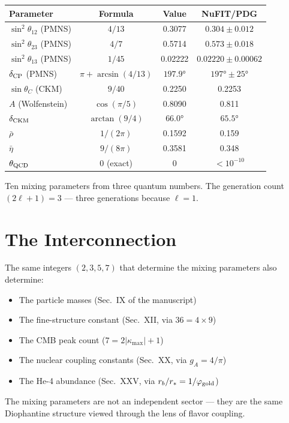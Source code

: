 \documentclass[11pt,letterpaper]{article}
\numberwithin{equation}{section}
\begin{document}
\begin{center}
\begin{tabular}{lccc}
\toprule
Parameter & Formula & Value & NuFIT/PDG \\
\midrule
$\sin^2\theta_{12}$ (PMNS) & $4/13$ & 0.3077 & $0.304 \pm 0.012$ \\
$\sin^2\theta_{23}$ (PMNS) & $4/7$ & 0.5714 & $0.573 \pm 0.018$ \\
$\sin^2\theta_{13}$ (PMNS) & $1/45$ & 0.02222 & $0.02220 \pm 0.00062$ \\
$\delta_{\rm CP}$ (PMNS) & $\pi + \arcsin(4/13)$ & $197.9°$ & $197° \pm 25°$ \\
$\sin\theta_C$ (CKM) & $9/40$ & 0.2250 & 0.2253 \\
$A$ (Wolfenstein) & $\cos(\pi/5)$ & 0.8090 & 0.811 \\
$\delta_{\rm CKM}$ & $\arctan(9/4)$ & $66.0°$ & $65.5°$ \\
$\bar\rho$ & $1/(2\pi)$ & 0.1592 & 0.159 \\
$\bar\eta$ & $9/(8\pi)$ & 0.3581 & 0.348 \\
$\theta_{\rm QCD}$ & 0 (exact) & 0 & $< 10^{-10}$ \\
\bottomrule
\end{tabular}
\end{center}

Ten mixing parameters from three quantum numbers.  The generation
count $(2\ell+1) = 3$ --- three generations because $\ell = 1$.

\section{The Interconnection}

The same integers $(2,3,5,7)$ that determine the mixing parameters
also determine:
\begin{itemize}
\item The particle masses (Sec.~IX of the manuscript)
\item The fine-structure constant (Sec.~XII, via $36 = 4 \times 9$)
\item The CMB peak count ($7 = 2|\kappa_{\max}|+1$)
\item The nuclear coupling constants (Sec.~XX, via $g_A = 4/\pi$)
\item The He-4 abundance (Sec.~XXV, via $r_b/r_* = 1/\varphi_{\rm gold}$)
\end{itemize}
The mixing parameters are not an independent sector --- they are the
same Diophantine structure viewed through the lens of flavor coupling.
\end{document}
